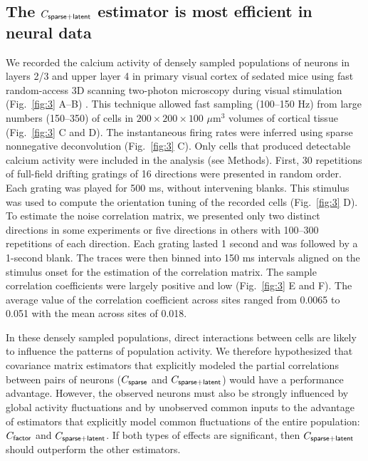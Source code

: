 \subsection*{The $C_{\sf sparse+latent}$ estimator is most efficient in neural data}
We recorded the calcium activity of densely sampled populations of neurons in layers 2/3 and upper layer 4 in primary visual cortex of sedated mice using fast random-access 3D scanning two-photon microscopy during visual stimulation (Fig.~\ref{fig:3} A--B) \cite{Reddy:2005, Katona:2012, Cotton:2013}. This technique allowed fast sampling (100--150 Hz) from large numbers (150--350) of cells in $200\times200\times100$ $\mu$m$^3$ volumes of cortical tissue (Fig.~\ref{fig:3} C and D).  The instantaneous firing rates were inferred using sparse nonnegative deconvolution \cite{Vogelstein:2010} (Fig.~\ref{fig:3} C). Only cells that produced detectable calcium activity were included in the analysis (see Methods).  First, 30 repetitions of full-field drifting gratings of 16 directions were presented in random order.  Each grating was played for 500 ms, without intervening blanks.  This stimulus was used to compute the orientation tuning of the recorded cells (Fig.~\ref{fig:3} D). To estimate the noise correlation matrix, we presented only two distinct directions in some experiments or five directions in others with 100--300 repetitions of each direction. Each grating lasted 1 second and was followed by a 1-second blank.  The traces were then binned into 150 ms intervals aligned on the stimulus onset for the estimation of the correlation matrix.   The sample correlation coefficients were largely positive and low (Fig.~\ref{fig:3} E and F). The average value of the correlation coefficient across sites ranged from 0.0065 to 0.051 with the mean across sites of 0.018.

In these densely sampled populations, direct interactions between cells are likely to influence the patterns of population activity.  We therefore hypothesized that covariance matrix estimators that explicitly modeled the partial correlations between pairs of neurons ($C_{\sf sparse}$ and $C_{\sf sparse+latent}$) would have a performance advantage.  However, the observed neurons must also be strongly influenced by global activity fluctuations and by unobserved common inputs to the advantage of estimators that explicitly model common fluctuations of the entire population: $C_{\sf factor}$ and $C_{\sf sparse+latent}$.  If both types of effects are significant, then $C_{\sf sparse+latent}$ should outperform the other estimators.

